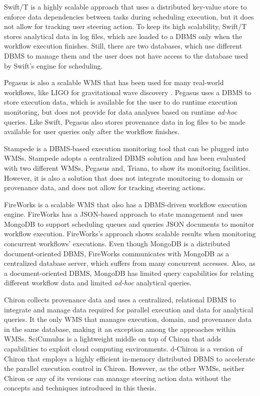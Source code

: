 Swift/T \cite{Wozniak2013Swift/T:,Duro2016Flexible}
is a highly scalable approach that uses a distributed key-value store to
enforce data dependencies between tasks during scheduling execution, but
it does not allow for tracking user steering action.
To keep its high scalability,
Swift/T stores analytical data in log files, which are loaded to a DBMS
only when the workflow execution finishes. Still, there are two
databases, which use different DBMS to manage them and the user does not
have access to the database used by Swift's engine for scheduling.

Pegasus \cite{Deelman2015Pegasus}
is also a scalable WMS that has been used for many real-world workflows, like LIGO for gravitational wave
discovery \cite{PhysRevLett.118.221101}.
Pegasus uses a DBMS to store execution data, which is available for the
user to do runtime execution monitoring, but does not provide for data
analyses based on runtime \emph{ad-hoc} queries. Like Swift, Pegasus
also stores provenance data in log files to be made available for
user queries only after the workflow finishes.

Stampede \cite{Gunter2011Online} is a DBMS-based
execution monitoring tool that can be plugged into WMSs. Stampede adopts
a centralized DBMS solution and has been evaluated with two different
WMSs, Pegasus and, Triana, to show its monitoring facilities. However, it
is also a solution that does not integrate monitoring to domain or
provenance data, and does not allow for tracking steering actions.

FireWorks is a scalable WMS \cite{Jain2015FireWorks:}
that also has a DBMS-driven workflow execution engine. FireWorks has a
JSON-based approach to state management and uses MongoDB to support
scheduling queues and queries JSON documents to monitor workflow
execution. FireWorks's approach shows scalable results when monitoring
concurrent workflows' executions. Even though MongoDB is a distributed
document-oriented DBMS, FireWorks communicates with MongoDB as a centralized
database server, which suffers from many concurrent accesses. Also, as a document-oriented DBMS, MongoDB has limited query
capabilities for relating different workflow data and limited
\emph{ad-hoc} analytical queries.

Chiron \cite{Ogasawara2011algebraic, Dias2015Data-centric}
collects provenance data and uses a centralized, relational DBMS to
integrate and manage data required for parallel execution and data for
analytical queries. It the only WMS that manages execution, domain, and provenance data in the same database, making it an exception among the approaches within WMSs. 
SciCumulus \cite{Oliveira2010SciCumulus:} is a lightweight middle on top of Chiron that adds capabilities to exploit cloud computing environments.
d-Chiron \cite{souza_controlling_2015_thesis,Souza2015Parallel}
is a version of Chiron that employs a highly efficient in-memory distributed DBMS to accelerate the parallel execution control in Chiron. However, as the other WMSs, neither Chiron or any of its versions can manage steering action data without the concepts and techniques introduced in this thesis.



